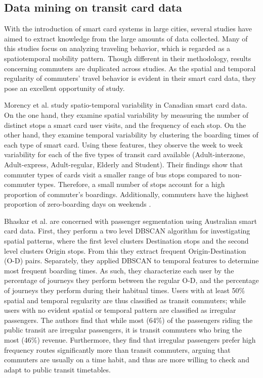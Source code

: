 \documentclass{article}
\begin{document}
\subsection{Data mining on transit card data}
With the introduction of smart card systems in large cities, several studies have aimed to extract knowledge from the large amounts of data collected. Many of this studies focus on analyzing traveling behavior, which is regarded as a spatiotemporal mobility pattern. Though different in their methodology, results concerning commuters are duplicated across studies. As the spatial and temporal regularity of commuters' travel behavior is evident in their smart card data, they pose an excellent opportunity of study.

Morency et al. study spatio-temporal variability in Canadian smart card data. On the one hand, they examine spatial variability by measuring the number of distinct stops a smart card user visits, and the frequency of each stop. On the other hand, they examine temporal variability by clustering the boarding times of each type of smart card. Using these features, they observe the week to week variability for each of the five types of transit card available (Adult-interzone, Adult-express, Adult-regular, Elderly and Student). Their findings show that commuter types of cards visit a smaller range of bus stops compared to non-commuter types. Therefore, a small number of stops account for a high proportion of commuter's boardings. Additionally, commuters have the highest proportion of zero-boarding days on weekends \cite{morency2007measuring}.

Bhaskar et al. are concerned with passenger segmentation using Australian smart card data. First, they perform a two level DBSCAN algorithm for investigating spatial patterns, where the first level clusters Destination stops and the second level clusters Origin stops.  From this they extract frequent Origin-Destination (O-D) pairs. Separately, they applied DBSCAN to temporal features to determine most frequent boarding times.  As such, they characterize each user by the percentage of journeys they perform between the regular O-D, and the percentage of journeys they perform during their habitual times. Users with at least 50\% spatial and temporal regularity are thus classified as transit commuters; while users with no evident spatial or temporal pattern are classified as irregular passengers. The authors find that while most (64\%) of the passengers riding the public transit are irregular passengers, it is transit commuters who bring the most (46\%) revenue. Furthermore, they find that irregular passengers prefer high frequency routes significantly more than transit commuters, arguing that commuters are usually on a time habit, and thus are more willing to check and adapt to public transit timetables. \cite{bhaskar2015passenger}
\end{document}
